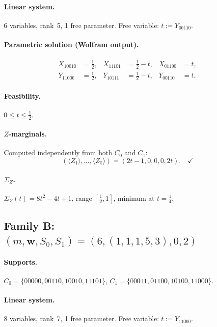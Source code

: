\documentclass{article}
\newcommand{\SigZ}{\Sigma_Z}
\begin{document}
\paragraph{Linear system.}
6 variables, rank~5, 1 free parameter.
Free variable: $t:=Y_{00110}$.

\paragraph{Parametric solution (Wolfram output).}
\[
\begin{aligned}
X_{10010} &= \tfrac{1}{2}, & X_{11101} &= \tfrac{1}{2}-t, & X_{01100} &= t, \\
Y_{11000} &= \tfrac{1}{2}, & Y_{10111} &= \tfrac{1}{2}-t, & Y_{00110} &= t.
\end{aligned}
\]

\paragraph{Feasibility.} $0\le t\le \frac{1}{2}$. \checkmark

\paragraph{$Z$-marginals.}
Computed independently from both $C_0$ and $C_1$:
\[
(\langle Z_1\rangle,\dots,\langle Z_5\rangle)
= (2t-1, 0, 0, 0, 2t). \quad\checkmark
\]

\paragraph{$\SigZ$.}
$\SigZ(t)=8t^2-4t+1$, range $[\tfrac12,1]$, minimum at $t=\tfrac14$. \checkmark

\subsection{Family B: $(m,\mathbf{w},S_0,S_1)=(6,(1,1,1,5,3),0,2)$}

\paragraph{Supports.}
$C_0=\{00000, 00110, 10010, 11101\}$,\quad
$C_1=\{00011, 01100, 10100, 11000\}$.

\paragraph{Linear system.}
8 variables, rank~7, 1 free parameter.
Free variable: $t:=Y_{11000}$.
\end{document}

